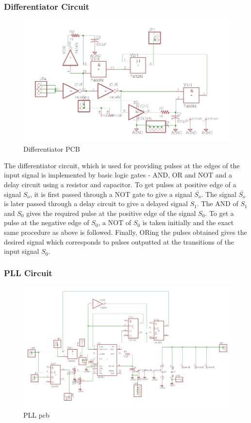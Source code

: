\documentclass{article}
\begin{document}
\subsubsection{Differentiator Circuit}
\begin{figure}[h]
  \centering
  \includegraphics[scale=0.5]{images/Diff_sch}
  \caption{Differentiator PCB}
  \label{fig:Differentitor_circuit}
\end{figure}
The differentiator circuit, which is used for providing pulses at the edges of the input signal is implemented by basic logic gates - AND, OR and NOT and a delay circuit using a resistor and capacitor. To get pulses at positive edge of a signal $S_o$, it is first passed through a NOT gate to give a signal $\bar{S_o}$. The signal $\bar{S_o}$ is later passed through a delay circuit to give a delayed signal $S_1$. The AND of $S_1$ and $S_0$ gives the required pulse at the positive edge of the signal $S_0$. To get a pulse at the negative edge of $S_0$, a NOT of $S_0$ is taken initially and the exact same procedure as above is followed. Finally, ORing the pulses obtained gives the desired signal which corresponds to pulses outputted at the transitions of the input signal $S_0$.    

\subsubsection{PLL Circuit}
\begin{figure}[h]
  \centering
  \includegraphics[scale=0.5]{images/PLL_sch}
  \caption{PLL pcb}
\end{figure}
\end{document}
